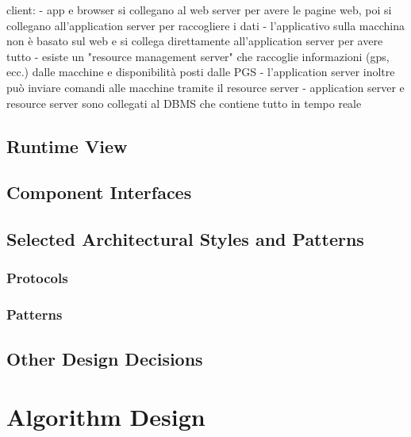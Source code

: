 \documentclass[english]{article}
\begin{document}
client:
- app e browser si collegano al web server per avere le pagine web, poi si collegano all'application server per raccogliere i dati
- l'applicativo sulla macchina non è basato sul web e si collega direttamente all'application server per avere tutto
- esiste un "resource management server" che raccoglie informazioni (gps, ecc.) dalle macchine e disponibilità posti dalle PGS
- l'application server inoltre può inviare comandi alle macchine tramite il resource server
- application server e resource server sono collegati al DBMS che contiene tutto in tempo reale

\subsection{Runtime View}


\subsection{Component Interfaces}

\subsection{Selected Architectural Styles and Patterns}


\subsubsection{Protocols}

\subsubsection{Patterns}

\subsection{Other Design Decisions}

\newpage

\section{Algorithm Design}

\end{document}
